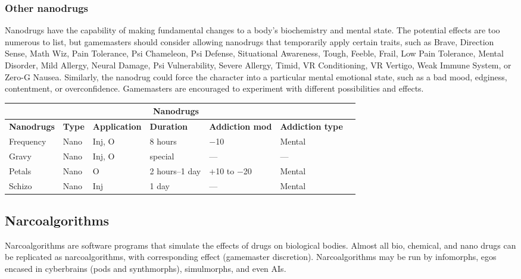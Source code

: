 \subsubsection{Other nanodrugs} 

Nanodrugs have the capability of making fundamental changes to a body’s biochemistry and mental state. The potential effects are too numerous to list, but gamemasters should consider allowing nanodrugs that temporarily apply certain traits, such as Brave, Direction Sense, Math Wiz, Pain Tolerance, Psi Chameleon, Psi Defense, Situational Awareness, Tough, Feeble, Frail, Low Pain Tolerance, Mental Disorder, Mild Allergy, Neural Damage, Psi Vulnerability, Severe Allergy, Timid, VR Conditioning, VR Vertigo, Weak Immune System, or Zero-G Nausea. Similarly, the nanodrug could force the character into a particular mental emotional state, such as a bad mood, edginess, contentment, or overconfidence. Gamemasters are encouraged to experiment with different possibilities and effects. 

\hspace{1cm} 

\begin{tabular}{|l|l|l|l|l|l|l|} \hline

\multicolumn{6}{|c|}{\textbf{Nanodrugs}}	\\ \hline

\textbf{Nanodrugs}	&\textbf{Type}	&\textbf{Application}	&\textbf{Duration}	&\textbf{Addiction mod}	&\textbf{Addiction type} \\ \hline

Frequency	&Nano	&Inj, O	&8 hours &$-$10	&Mental \\ \hline

Gravy	&Nano	&Inj, O	&special &--- &--- \\ \hline

Petals	&Nano	&O	&2 hours--1 day	&+10 to $-$20	&Mental \\ \hline

Schizo	&Nano	&Inj	&1 day	&--- &Mental \\ \hline

\end{tabular} \label{tab:nanodrugs} 



\subsection{Narcoalgorithms} \label{sec:narcoalgorithms} 

Narcoalgorithms are software programs that simulate the effects of drugs on biological bodies. Almost all bio, chemical, and nano drugs can be replicated as narcoalgorithms, with corresponding effect (gamemaster discretion). Narcoalgorithms may be run by infomorphs, egos encased in cyberbrains (pods and synthmorphs), simulmorphs, and even AIs. 

